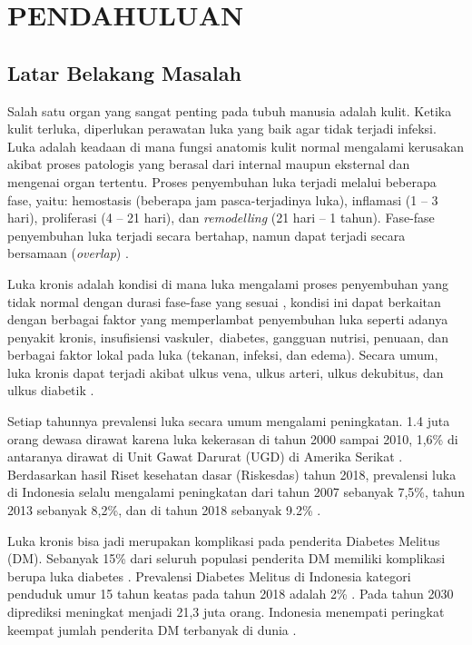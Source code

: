 
\chapter{PENDAHULUAN}
\section{Latar Belakang Masalah}

Salah satu organ yang sangat penting pada tubuh manusia adalah kulit. Ketika kulit terluka, diperlukan perawatan luka yang baik agar tidak terjadi infeksi. Luka adalah keadaan di mana fungsi anatomis kulit normal mengalami kerusakan akibat proses patologis yang berasal dari internal maupun eksternal dan mengenai organ tertentu. Proses penyembuhan luka terjadi melalui beberapa fase, yaitu: hemostasis (beberapa jam pasca-terjadinya luka), inflamasi (1 – 3 hari), proliferasi (4 – 21 hari), dan \emph{remodelling} (21 hari – 1 tahun). Fase-fase penyembuhan luka terjadi secara bertahap, namun dapat terjadi secara bersamaan (\emph{overlap}) \citep{pat2018:1}. %

Luka kronis adalah kondisi di mana luka mengalami proses penyembuhan yang tidak normal dengan durasi fase-fase yang sesuai \citep{landen2016transition:2}, kondisi ini dapat berkaitan dengan berbagai faktor yang memperlambat penyembuhan luka seperti adanya penyakit kronis, insufisiensi vaskuler, diabetes, gangguan nutrisi, penuaan, dan berbagai faktor lokal pada luka (tekanan, infeksi, dan edema). Secara umum, luka kronis dapat terjadi akibat ulkus vena, ulkus arteri, ulkus dekubitus, dan ulkus diabetik \citep{zhao2016inflammation:3}. %

Setiap tahunnya prevalensi luka secara umum mengalami peningkatan. 1.4 juta orang dewasa dirawat karena luka kekerasan di tahun 2000 sampai 2010, 1,6\% di antaranya dirawat di Unit Gawat Darurat (UGD) di Amerika Serikat \citep{monuteaux2017cross:4}. Berdasarkan hasil Riset kesehatan dasar (Riskesdas) tahun 2018, prevalensi luka di Indonesia selalu mengalami peningkatan dari tahun 2007 sebanyak 7,5\%, tahun 2013 sebanyak 8,2\%, dan di tahun 2018 sebanyak 9.2\% \citep{hasilkesehatan2018riset}. %

Luka kronis bisa jadi merupakan komplikasi pada penderita Diabetes Melitus (DM). Sebanyak 15\% dari seluruh populasi penderita DM memiliki komplikasi berupa luka diabetes \citep{fard2007assessment:6}. Prevalensi Diabetes Melitus di Indonesia kategori penduduk umur 15 tahun keatas pada tahun 2018 adalah 2\% \citep{hasilkesehatan2018riset}. Pada tahun 2030 diprediksi meningkat menjadi 21,3 juta orang. Indonesia menempati peringkat keempat jumlah penderita DM terbanyak di dunia \citep{wild2004global:7}. %

